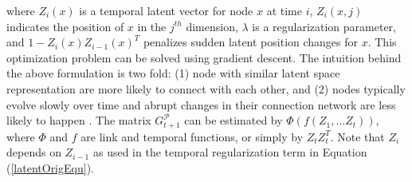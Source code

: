 where $Z_i(x)$ is a temporal latent vector for node $x$ at time $i$, $Z_i(x,j)$ indicates the position of $x$ in the $j^{th}$ dimension, $\lambda$ is a regularization parameter, and $1-Z_{i}(x)Z_{i-1}(x)^T$ penalizes sudden latent position changes for $x$. This optimization problem can be solved using gradient descent. The intuition behind the above formulation is two fold: (1) node with similar latent space representation are more likely to connect with each other, and (2) nodes typically evolve slowly over time and abrupt changes in their connection network are less likely to happen \cite{zhang2014inferring}. 
The matrix $G^\mathcal{P}_{t+1}$ can be estimated by $\Phi(f(Z_1,...Z_t))$, where $\Phi$ and $f$ are link and temporal functions, or simply by $Z_tZ_t^T$. Note that $Z_i$ depends on $Z_{i-1}$ as used in the temporal regularization term in Equation (\ref{latentOrigEqu}).

 



